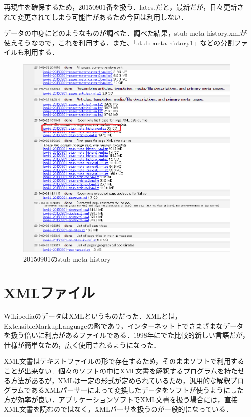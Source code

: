 再現性を確保するため，20150901番を扱う．latestだと，最新だが，日々更新されて変更されてしまう可能性があるため今回は利用しない．



データの中身にどのようなものが調べた．\cite{wikipedia_data_list}調べた結果，stub-meta-history.xmlが使えそうなので，これを利用する．また、「stub-meta-history1」などの分割ファイルも利用する．

\begin{figure}[H]
\centering
\includegraphics[width=14cm]{wiki20150901.PNG}
\caption{20150901のstub-meta-history}\label{サンプル図}
\end{figure}



\section{XMLファイル}

WikipediaのデータはXMLというものだった．XMLとは，ExtensibleMarkupLanguageの略であり，インターネット上でさまざまなデータを扱う倍いに利点があるファイルである．1998年にでた比較的新しい言語だが，仕様が簡単なため，広く使用されるようになった．

XML文書はテキストファイルの形で存在するため，そのままソフトで利用することが出来ない．個々のソフトの中にXML文書を解釈するプログラムを持たせる方法があるが，XMLは一定の形式が定められているため，汎用的な解釈プログラムであるXMLパーサーによって変換したデータをソフトが使うようにした方が効率が良い．アプリケーションソフトでXML文書を扱う場合には，直接XML文書を読むのではなく，XMLパーサを扱うのが一般的になっている．\cite{xml1}




